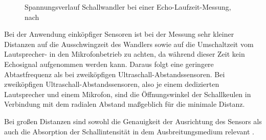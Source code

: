 \begin{figure}[h]
    \begin{center}

        \caption{Spannungsverlauf Schallwandler bei einer Echo-Laufzeit-Messung, nach \cite{Hering:2023}}
        \label{TastbetriebELM}
    \end{center}
\end{figure}

Bei der Anwendung einköpfiger Sensoren ist bei der Messung sehr kleiner Distanzen auf die Ausschwingzeit des Wandlers sowie auf die Umschaltzeit vom Lautsprecher- in den Mikrofonbetrieb zu achten, da während dieser Zeit kein Echosignal aufgenommen werden kann. Daraus folgt eine geringere Abtastfrequenz als bei zweiköpfigen Ultraschall-Abstandssensoren. Bei zweiköpfigen Ultraschall-Abstandssensoren, also je einem dedizierten Lautsprecher und einem Mikrofon, sind die Öffnungswinkel der Schallkeulen in Verbindung mit dem radialen Abstand maßgeblich für die minimale Distanz.  

Bei großen Distanzen sind sowohl die Genauigkeit der Ausrichtung des Sensors als auch die Absorption der Schallintensität in dem Ausbreitungsmedium relevant \cite{Hering:2023}. 


